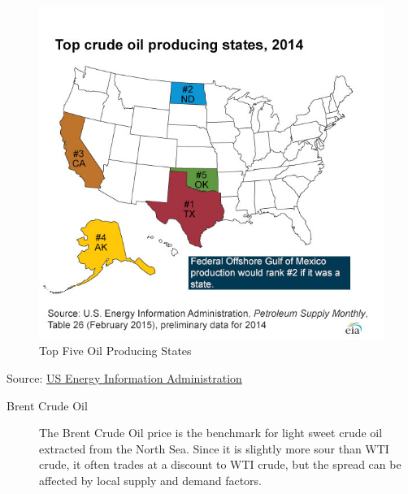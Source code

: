 \documentclass[
  letterpaper,
  DIV=11,
  numbers=noendperiod]{scrreprt}
\begin{document}
\begin{figure}

{\centering \includegraphics{images/top_5_petroleum_states-large.jpg}

}

\caption{Top Five Oil Producing States}

\end{figure}

Source:
\href{http://www.eia.gov/Energyexplained/index.cfm?page=oil_home}{US
Energy Information Administration}

\begin{description}
\item[Brent Crude Oil]
The Brent Crude Oil price is the benchmark for light sweet crude oil
extracted from the North Sea. Since it is slightly more sour than WTI
crude, it often trades at a discount to WTI crude, but the spread can be
affected by local supply and demand factors.
\end{description}
\end{document}

